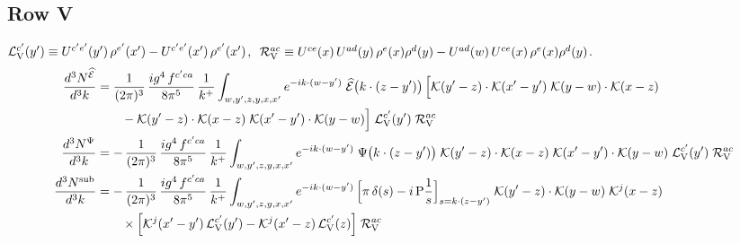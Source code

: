\documentclass[9pt]{article}
\numberwithin{equation}{section}
\begin{document}
\subsection{Row V}
\noindent $\mathcal{L}_{\rm V}^{c'}(y')\equiv U^{c'e'}(y')\,\rho^{e'}(x')-U^{c'e'}(x')\,\rho^{e'}(x')$, $\;\mathcal{R}_{\rm V}^{ac}\equiv U^{ce}(x)\,U^{ad}(y)\,\rho^{e}(x)\rho^{d}(y)-U^{ad}(w)\,U^{ce}(x)\,\rho^{e}(x)\rho^{d}(y)$.
\begin{align}
\frac{d^{3}N^{\widehat{\mathcal{E}}}}{d^{3}k} & = \frac{1}{(2\pi)^{3}}\, \frac{ig^{4}\,f^{c'ca}}{8\pi^{5}}\, \frac{1}{k^{+}}\int_{w,y',z,y,x,x'} e^{-ik\cdot (w-y')}\;\widehat{\mathcal{E}}\big(k\cdot(z-y')\big)\,\Big[\mathcal{K}(y'-z)\cdot\mathcal{K}(x'-y')\;\mathcal{K}(y-w)\cdot\mathcal{K}(x-z)\notag \\ & \qquad-\mathcal{K}(y'-z)\cdot\mathcal{K}(x-z)\;\mathcal{K}(x'-y')\cdot\mathcal{K}(y-w)\Big]\;\mathcal{L}_{\rm V}^{c'}(y')\;\mathcal{R}_{\rm V}^{ac}\\
\frac{d^{3}N^{\Psi}}{d^{3}k} & = -\,\frac{1}{(2\pi)^{3}}\, \frac{ig^{4}\,f^{c'ca}}{8\pi^{5}}\, \frac{1}{k^{+}}\int_{w,y',z,y,x,x'} e^{-ik\cdot (w-y')}\;\Psi\big(k\cdot(z-y')\big)\;\mathcal{K}(y'-z)\cdot\mathcal{K}(x-z)\;\mathcal{K}(x'-y')\cdot\mathcal{K}(y-w)\;\mathcal{L}_{\rm V}^{c'}(y')\;\mathcal{R}_{\rm V}^{ac}\\
\frac{d^{3}N^{\rm sub}}{d^{3}k} & = -\,\frac{1}{(2\pi)^{3}}\, \frac{ig^{4}\,f^{c'ca}}{8\pi^{5}}\, \frac{1}{k^{+}}\int_{w,y',z,y,x,x'} e^{-ik\cdot (w-y')}\,\Big[\pi\,\delta(s)-i\,{\rm P}\frac{1}{s}\Big]_{s=k\cdot(z-y')}\;\mathcal{K}(y'-z)\cdot\mathcal{K}(y-w)\;\mathcal{K}^{j}(x-z)\notag \\ & \qquad\times\Big[\mathcal{K}^{j}(x'-y')\,\mathcal{L}_{\rm V}^{c'}(y')-\mathcal{K}^{j}(x'-z)\,\mathcal{L}_{\rm V}^{c'}(z)\Big]\;\mathcal{R}_{\rm V}^{ac}
\end{align}
\end{document}
